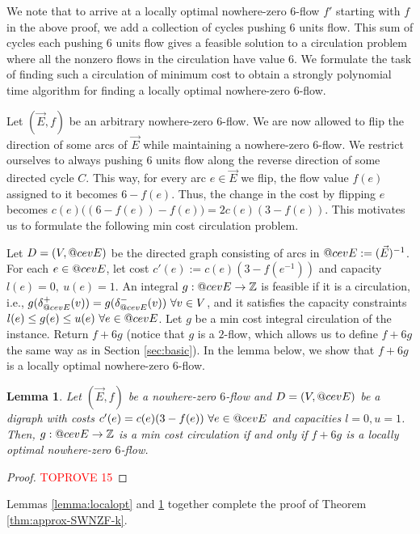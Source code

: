 \documentclass[11pt]{article}
\makeatletter
\newtheorem{lemma}[theorem]{Lemma}
\newcommand{\Z}{\mathbb{Z}}
\DeclareRobustCommand{\cev}[1]{{\mathpalette\do@cev{#1}}}
\newcommand{\do@cev}[2]{\vbox{\offinterlineskip
    \sbox\z@{$\m@th#1 x$}\ialign{##\cr
      \hidewidth\reflectbox{$\m@th#1\vec{}\mkern4mu$}\hidewidth\cr
      \noalign{\kern-\ht\z@}
      $\m@th#1#2$\cr
    }}}
\makeatother
\begin{document}
We note that to arrive at a locally optimal nowhere-zero 6-flow $f'$ starting with $f$ in the above proof, we add a collection of cycles pushing $6$ units flow. This sum of cycles each pushing $6$ units flow gives a feasible solution to a circulation problem where all the nonzero flows in the circulation have value $6$. We formulate the task of finding such a circulation of minimum cost to obtain a strongly polynomial time algorithm for finding a locally optimal nowhere-zero $6$-flow.

Let $(\vec{E},f)$ be an arbitrary nowhere-zero $6$-flow. We are now allowed to flip the direction of some arcs of $\vec{E}$ while maintaining a nowhere-zero $6$-flow. We restrict ourselves to always pushing $6$ units flow along the reverse direction of some directed cycle $C$. This way, for every arc $e\in \vec{E}$ we flip, the flow value $f(e)$ assigned to it becomes $6-f(e)$. Thus, the change in the cost by flipping $e$ becomes $c(e)\big((6-f(e))-f(e)\big)=2c(e)
(3-f(e))$. This motivates us to formulate the following min cost circulation problem.

Let $D=(V,\cev{E})$ be the directed graph consisting of arcs in $\cev{E}:=(\vec{E})^{-1}$. For each $e\in \cev{E}$, let cost $c'(e):=c(e)(3-f(e^{-1}))$ and capacity $l(e)=0,\ u(e)=1$. An integral $g:\cev{E}\rightarrow \Z$ is feasible if it is a circulation, i.e., $g(\delta_{\cev{E}}^+(v))=g(\delta_{\cev{E}}^-(v))\ \forall v\in V$, and it satisfies the capacity constraints $l(e)\leq g(e)\leq u(e)\ \forall e\in \cev{E}$. Let $g$ be a min cost integral circulation of the instance. Return $f+6g$ (notice that $g$ is a $2$-flow, which allows us to define $f+6g$ the same way as in Section \ref{sec:basic}). In the lemma below, we show that $f+6g$ is a locally optimal nowhere-zero $6$-flow.

\begin{lemma}\label{lemma:localopt+mincostflow}
    Let $(\vec{E},f)$ be a nowhere-zero $6$-flow and $D=(V,\cev{E})$ be a digraph with costs $c'(e)=c(e)(3-f(e))\ \forall e\in\cev{E}$ and capacities $l=0,u=1$. Then, $g:\cev{E}\rightarrow \Z$ is a min cost circulation if and only if $f+6g$ is a locally optimal nowhere-zero $6$-flow.
\end{lemma}
\begin{proof}\textcolor{red}{TOPROVE 15}\end{proof}

Lemmas \ref{lemma:localopt} and \ref{lemma:localopt+mincostflow} together complete the proof of Theorem \ref{thm:approx-SWNZF-k}.
\end{document}
